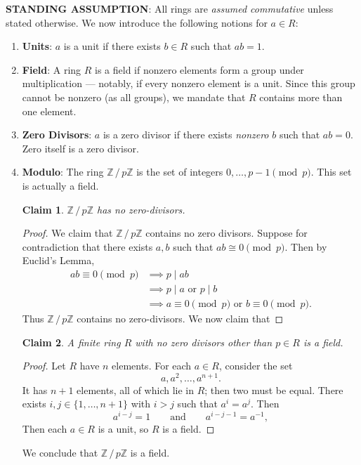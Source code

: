 \documentclass[11pt]{article}
\newtheorem{claim}{Claim}
\begin{document}
\textbf{STANDING ASSUMPTION}: All rings are \textit{assumed commutative} unless stated otherwise. We now introduce the following notions for $a \in R$:
\begin{enumerate}
	\item \textbf{Units}: $a$ is a unit if there exists $b \in R$ such that $ab = 1$.
	\item \textbf{Field}: A ring $R$ is a field if nonzero elements form a group under multiplication --- notably, if every nonzero element is a unit. Since this group cannot be nonzero (as all groups), we mandate that $R$ contains more than one element.
	\item \textbf{Zero Divisors}: $a$ is a zero divisor if there exists \textit{nonzero} $b$ such that $ab = 0$. Zero itself is a zero divisor.
	\item \textbf{Modulo}: The ring $\mathbb{Z} \,/\, p \mathbb{Z}$ is the set of integers $0, \ldots, p - 1 \pmod{p}$. This set is actually a field.
		\begin{adjustwidth}{0.5cm}{}
			\begin{claim}
				$\mathbb{Z} \,/\, p \mathbb{Z}$ has no zero-divisors.
			\end{claim}
			\begin{proof}\renewcommand{\qedsymbol}{}
				We claim that $\mathbb{Z} \,/\, p \mathbb{Z}$ contains no zero divisors. Suppose for contradiction that there exists $a, b$ such that $ab \cong 0 \pmod{p}$. Then by Euclid's Lemma,
				\begin{align*}
					ab \equiv 0 \pmod{p} &\implies p \mid ab \\
					&\implies p \mid a \text{ or } p \mid b \\
					&\implies a \equiv 0 \pmod{p} \text{ or } b \equiv 0 \pmod{p}.
				\end{align*}
				Thus $\mathbb{Z} \,/\, p \mathbb{Z}$ contains no zero-divisors.
				We now claim that
			\end{proof}
		\end{adjustwidth} 
		\begin{adjustwidth}{0.5cm}{}
			\begin{claim}
				A finite ring $R$ with no zero divisors other than $p \in R$ is a field.
			\end{claim}
			\begin{proof}\renewcommand{\qedsymbol}{}
				Let $R$ have $n$ elements. For each $a \in R$, consider the set
				\[
					a, a^{2}, \ldots, a^{n + 1}.
				\]
				It has $n + 1$ elements, all of which lie in $R$; then two must be equal. There exists $i, j \in \{ 1, \ldots, n + 1 \}$ with $i > j$ such that $a^{i} = a^{j}$. Then
				\[
					a^{i - j} = 1 \qquad \text{and} \qquad a^{i - j - 1} = a^{-1},
				\]
				Then each $a \in R$ is a unit, so $R$ is a field.
			\end{proof}
		\end{adjustwidth}
	We conclude that $\mathbb{Z} \,/\, p \mathbb{Z}$ is a field.
\end{enumerate}
\end{document}
